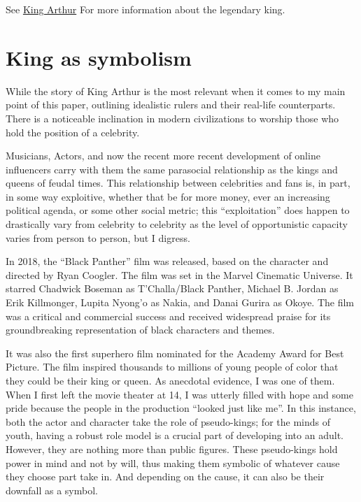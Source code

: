 \documentclass[
]{article}
\begin{document}
See \href{https://www.britannica.com/topic/King-Arthur}{King Arthur} For
more information about the legendary king.

\hypertarget{king-as-symbolism}{%
\section{King as symbolism}\label{king-as-symbolism}}

While the story of King Arthur is the most relevant when it comes to my
main point of this paper, outlining idealistic rulers and their
real-life counterparts. There is a noticeable inclination in modern
civilizations to worship those who hold the position of a celebrity.

Musicians, Actors, and now the recent more recent development of online
influencers carry with them the same parasocial relationship as the
kings and queens of feudal times. This relationship between celebrities
and fans is, in part, in some way exploitive, whether that be for more
money, ever an increasing political agenda, or some other social metric;
this ``exploitation'' does happen to drastically vary from celebrity to
celebrity as the level of opportunistic capacity varies from person to
person, but I digress.

In 2018, the ``Black Panther'' film was released, based on the character
and directed by Ryan Coogler. The film was set in the Marvel Cinematic
Universe. It starred Chadwick Boseman as T'Challa/Black Panther, Michael
B. Jordan as Erik Killmonger, Lupita Nyong'o as Nakia, and Danai Gurira
as Okoye. The film was a critical and commercial success and received
widespread praise for its groundbreaking representation of black
characters and themes.

It was also the first superhero film nominated for the Academy Award for
Best Picture. The film inspired thousands to millions of young people of
color that they could be their king or queen. As anecdotal evidence, I
was one of them. When I first left the movie theater at 14, I was
utterly filled with hope and some pride because the people in the
production ``looked just like me''. In this instance, both the actor and
character take the role of pseudo-kings; for the minds of youth, having
a robust role model is a crucial part of developing into an adult.\\
However, they are nothing more than public figures. These pseudo-kings
hold power in mind and not by will, thus making them symbolic of
whatever cause they choose part take in. And depending on the cause, it
can also be their downfall as a symbol.
\end{document}
